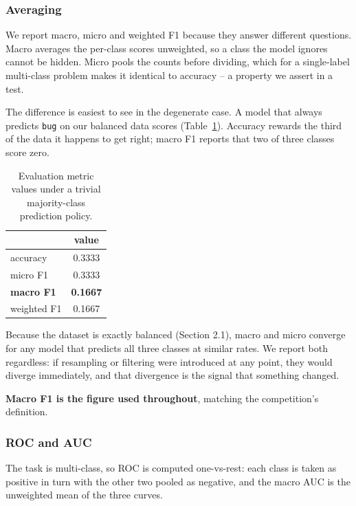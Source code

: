 \subsubsection{Averaging}

We report macro, micro and weighted F1 because they answer different questions. Macro averages the per-class scores unweighted, so a class the model ignores cannot be hidden. Micro pools the counts before dividing, which for a single-label multi-class problem makes it identical to accuracy -- a property we assert in a test.

The difference is easiest to see in the degenerate case. A model that always predicts \texttt{bug} on our balanced data scores (Table~\ref{tab:degenerate_case_metrics}). Accuracy rewards the third of the data it happens to get right; macro F1 reports that two of three classes score zero.

\begin{table}[H]
\centering
\caption{Evaluation metric values under a trivial majority-class prediction policy.}
\label{tab:degenerate_case_metrics}
\vspace{0.5em}
\begin{tabular}{l c}
\hline
 & value \\
\hline
accuracy & 0.3333 \\
micro F1 & 0.3333 \\
\textbf{macro F1} & \textbf{0.1667} \\
weighted F1 & 0.1667 \\
\hline
\end{tabular}
\end{table}

Because the dataset is exactly balanced (Section 2.1), macro and micro converge for any model that predicts all three classes at similar rates. We report both regardless: if resampling or filtering were introduced at any point, they would diverge immediately, and that divergence is the signal that something changed.

\textbf{Macro F1 is the figure used throughout}, matching the competition's definition.

\subsubsection{ROC and AUC}

The task is multi-class, so ROC is computed one-vs-rest: each class is taken as positive in turn with the other two pooled as negative, and the macro AUC is the unweighted mean of the three curves.

